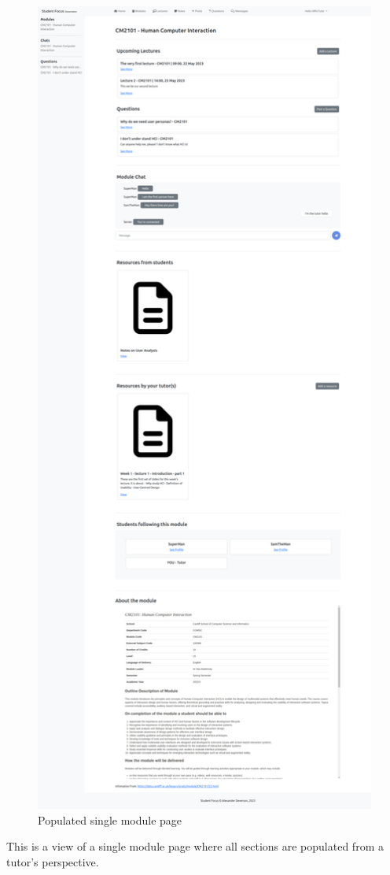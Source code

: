 \begin{figure}[H]
\centering
\includegraphics[scale=0.13]{images/application/36 - tutor_module_page_populated.png}
\caption{Populated single module page}
\label{fig:figure2}
\end{figure}

This is a view of a single module page  where all sections are populated from a tutor's perspective.
